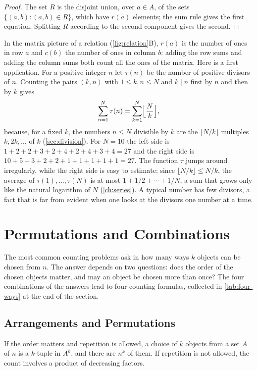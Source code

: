 \begin{proof}
The set $R$ is the disjoint union, over $a\in A$, of the sets $\{(a,b): (a,b)\in R\}$, which have $r(a)$ elements; the sum rule gives the first equation. Splitting $R$ according to the second component gives the second.
\end{proof}

In the matrix picture of a relation (\cref{fig:relation}B), $r(a)$ is the number of ones in row $a$ and $c(b)$ the number of ones in column $b$: adding the row sums and adding the column sums both count all the ones of the matrix. Here is a first application. For a positive integer $n$ let $\tau(n)$ be the number of positive divisors of $n$. Counting the pairs $(k,n)$ with $1\le k,n\le N$ and $k\mid n$ first by $n$ and then by $k$ gives
\begin{equation}
\sum_{n=1}^{N}\tau(n)=\sum_{k=1}^{N}\Bigl\lfloor\frac Nk\Bigr\rfloor ,
\label{eq:divisor-sum}
\end{equation}
because, for a fixed $k$, the numbers $n\le N$ divisible by $k$ are the $\lfloor N/k\rfloor$ multiples $k,2k,\ldots$ of $k$ (\cref{sec:division}). For $N=10$ the left side is $1+2+2+3+2+4+2+4+3+4=27$ and the right side is $10+5+3+2+2+1+1+1+1+1=27$. The function $\tau$ jumps around irregularly, while the right side is easy to estimate: since $\lfloor N/k\rfloor\le N/k$, the average of $\tau(1),\ldots,\tau(N)$ is at most $1+1/2+\cdots+1/N$, a sum that grows only like the natural logarithm of $N$ (\cref{ch:series}). A typical number has few divisors, a fact that is far from evident when one looks at the divisors one number at a time.

\section{Permutations and Combinations}
\label{sec:perm-comb}

The most common counting problems ask in how many ways $k$ objects can be chosen from $n$. The answer depends on two questions: does the order of the chosen objects matter, and may an object be chosen more than once? The four combinations of the answers lead to four counting formulas, collected in \cref{tab:four-ways} at the end of the section.

\subsection{Arrangements and Permutations}

If the order matters and repetition is allowed, a choice of $k$ objects from a set $A$ of $n$ is a $k$-tuple in $A^k$, and there are $n^k$ of them. If repetition is not allowed, the count involves a product of decreasing factors.

